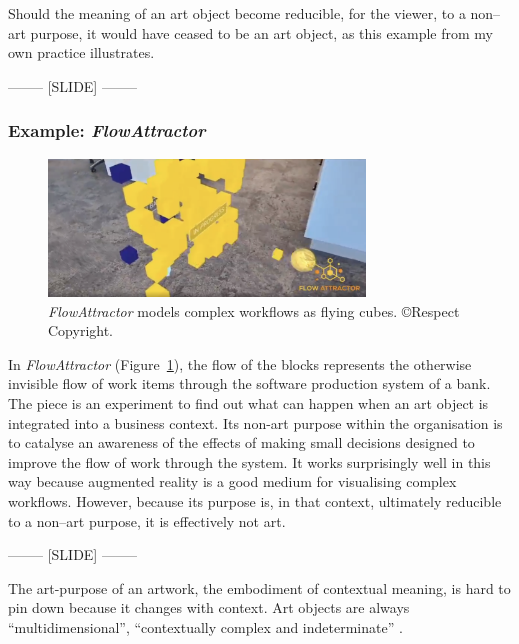 \documentclass[letter:wpaper]{article}
\begin{document}
    Should the meaning of an art object become reducible, for the viewer, to a non–art purpose, it would have ceased to be an art object, as this example from my own practice illustrates.

-------- [SLIDE] --------

    \subsubsection{Example: \emph{FlowAttractor}}

    \begin{figure}[h]
        \includegraphics[width=3.31in]{flow-attractor.png}
        \caption{\emph{FlowAttractor} models complex workflows as flying cubes. \copyright Respect Copyright.}
        \label{fig:flow-attractor}
    \end{figure}

    In \emph{FlowAttractor} (Figure~\ref{fig:flow-attractor}), the flow of the blocks represents the otherwise invisible flow of work items through the software production system of a bank. The piece is an experiment to find out what can happen when an art object is integrated into a business context. Its non-art purpose within the organisation is to catalyse an awareness of the effects of making small decisions designed to improve the flow of work through the system. It works surprisingly well in this way because augmented reality is a good medium for visualising complex workflows. However, because its purpose is, in that context, ultimately reducible to a non–art purpose, it is effectively not art.
    
-------- [SLIDE] --------

    The art-purpose of an artwork, the embodiment of contextual meaning, is hard to pin down because it changes with context. Art objects are always ``multidimensional'', ``contextually complex and indeterminate'' \citep[p.25]{HoelscherThPtcsOfPhsSpc2014}.
    
\end{document}

